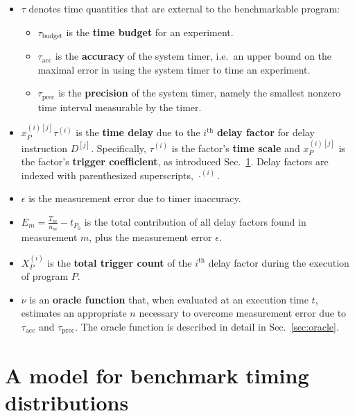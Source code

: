 \documentclass[conference]{IEEEtran}
\begin{document}
\begin{itemize}
    \item
    $\tau$ denotes time quantities that are external to the benchmarkable program:
    \begin{itemize}
        \item $\tau_{\textrm{budget}}$ is the \textbf{time budget} for an experiment.
        \item $\tau_{\textrm{acc}}$ is the \textbf{accuracy} of the system timer, i.e.\ an upper bound on the maximal error in using the system timer to time an experiment.
        \item $\tau_{\textrm{prec}}$ is the \textbf{precision} of the system timer, namely the smallest nonzero time interval measurable by the timer.
    \end{itemize}

    \item
    $x_P^{(i)[j]} \tau^{(i)}$ is the \textbf{time delay} due to the
    $i^{\textrm{th}}$ \textbf{delay factor} for delay instruction $D^{[j]}$.  Specifically,
    $\tau^{(i)}$ is the factor's \textbf{time scale} and $x_P^{(i)[j]}$ is the factor's
    \textbf{trigger coefficient}, as introduced Sec.~\ref{sec:model}. Delay factors are indexed with  parenthesized
    superscripts, $\cdot^{(i)}$.

    \item
    $\epsilon$ is the measurement error due to timer inaccuracy.

    \item
    $E_m = \frac{T_m}{n_m} - t_{P_0}$ is the total contribution of all delay
factors found in measurement $m$, plus the measurement error $\epsilon$.

    \item
    $X^{(i)}_P$ is the \textbf{total trigger count} of the $i^{\textrm{th}}$
    delay factor during the execution of program $P$.

    \item
    $\nu$ is an \textbf{oracle function} that, when evaluated at an execution
time $t$, estimates an appropriate $n$ necessary to overcome measurement error
due to
    $\tau_{\textrm{acc}}$ and $\tau_{\textrm{prec}}$. The oracle function is described in detail in Sec.~\ref{sec:oracle}.
\end{itemize}

\section{A model for benchmark timing distributions}
\label{sec:model}
\end{document}
